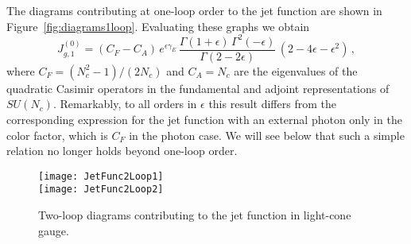\documentclass[12pt]{article}
\numberwithin{equation}{section}
\begin{document}
The diagrams contributing at one-loop order to the jet function are shown in Figure~\ref{fig:diagrams1loop}. Evaluating these graphs we obtain 
\begin{equation}
   J_{g,1}^{(0)}
   = (C_F-C_A)\,e^{\epsilon\gamma_E}\,\frac{\Gamma(1+\epsilon)\,\Gamma^2(-\epsilon)}{\Gamma(2-2\epsilon)}\,
    (2-4\epsilon-\epsilon^2) \,,
\end{equation}
where $C_F=(N_c^2-1)/(2 N_c)$ and $C_A=N_c$ are the eigenvalues of the quadratic Casimir operators in the fundamental and adjoint representations of $SU(N_c)$. Remarkably, to all orders in $\epsilon$ this result differs from the corresponding expression for the jet function with an external photon only in the color factor, which is $C_F$ in the photon case. We will see below that such a simple relation no longer holds beyond one-loop order.

\begin{figure}[t]
\begin{center}
\texttt{[image: JetFunc2Loop1]}\\[3mm]
\texttt{[image: JetFunc2Loop2]}
\caption{\label{fig:diagrams2loop}
Two-loop diagrams contributing to the jet function in light-cone gauge.}
\end{center}
\end{figure}
\end{document}
